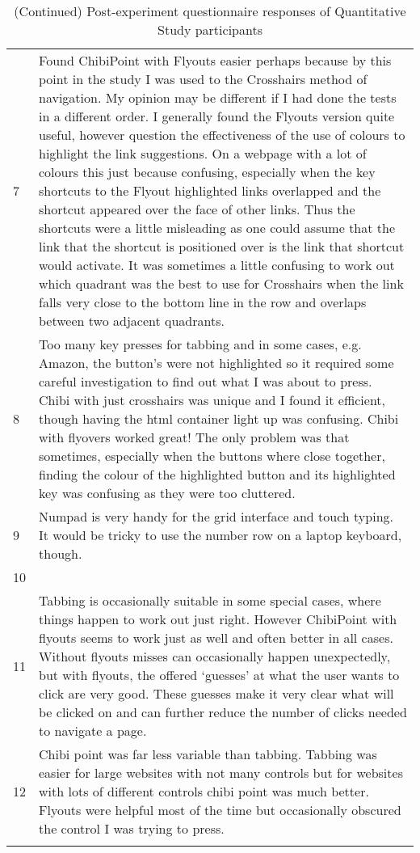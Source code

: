 \begin{longtable}{p{1cm}|p{\textwidth-1cm-1.5cm}}
7	&	Found ChibiPoint with Flyouts easier perhaps because by this  point in the study I was used to the Crosshairs method of navigation. My opinion may be different if I had done the tests in a different order.\newline
I generally found the Flyouts version quite useful, however question the effectiveness of the use of colours to highlight the link suggestions. On a webpage with a lot of colours this just because confusing, especially when the key shortcuts to the Flyout highlighted links overlapped and the shortcut appeared over the face of other links. Thus the shortcuts were a little misleading as one could assume that the link that the shortcut is positioned over is the link that shortcut would activate.\newline
It was sometimes a little confusing to work out which quadrant was the best to use for Crosshairs when the link falls very close to the bottom line in the row and overlaps between two adjacent quadrants. 	\\
8	&	Too many key presses for tabbing and in some cases, e.g. Amazon, the button's were not highlighted so it required some careful investigation to find out what I was about to press.\newline
Chibi with just crosshairs was unique and I found it efficient, though having the html container light up was confusing.\newline
Chibi with flyovers worked great!  The only problem was that sometimes, especially when the buttons where close together, finding the colour of the highlighted button and its highlighted key was confusing as they were too cluttered.	\\
9	&	Numpad is very handy for the grid interface and touch typing. It would be tricky to use the number row on a laptop keyboard, though.	\\
10	&		\\
11	&	Tabbing is occasionally suitable in some special cases, where things happen to work out just right. However ChibiPoint with flyouts seems to work just as well and often better in all cases. Without flyouts misses can occasionally happen unexpectedly, but with flyouts, the offered `guesses' at what the user wants to click are very good. These guesses make it very clear what will be clicked on and can further reduce the number of clicks needed to navigate a page. 	\\
12	&	Chibi point was far less variable than tabbing. Tabbing was easier for large websites with not many controls but for websites with lots of different controls chibi point was much better. Flyouts were helpful most of the time but occasionally obscured the control I was trying to press.	\\
\hline
\caption{(Continued) Post-experiment questionnaire responses of Quantitative Study participants}
\label{fig:quantpost_feedback}
\end{longtable}